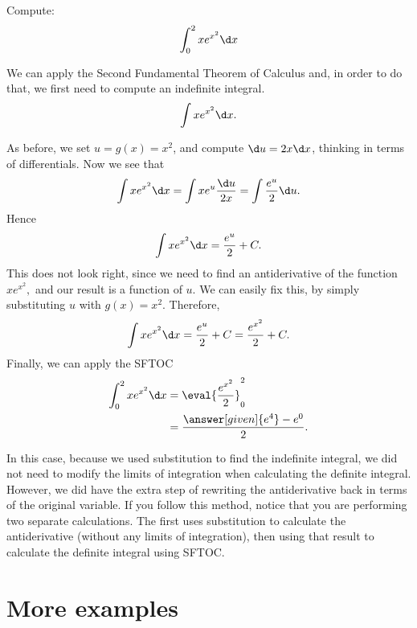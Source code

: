 \documentclass{ximera}
\begin{document}
\begin{example}
	Compute:
	\[ \int_0^2 x e^{x^2}\d x \]
	\begin{explanation}
		We can apply the Second Fundamental Theorem of Calculus and, in order to do that, we first need to compute an indefinite integral.
		\[ \int  x e^{x^2} \d x. \]
		
		As before, we set $u=g(x)=x^2$, and compute $\d u =  2x \d x$,
		 thinking in terms of differentials. Now we see that
		\[ \int   x e^{x^2} \d x = \int x e^{u} \frac{\d u}{2x} = \int \frac{e^{u}}{2}\d u . \]
		Hence 
		\[ \int  x e^{x^2} \d x = \frac{e^{u}}{2}+C . \]
		This does not look right, since  we need to find an antiderivative of the function $ x e^{x^2},$ and our result is a function of $u$.
		We can easily fix this, by simply substituting $u$ with $g(x)=x^2$.
		Therefore,
		\[ \int xe^{x^2}\d x =\frac{e^{u}}{2}+C= \frac{e^{x^2}}{2}+C . \]
		Finally, we can apply the SFTOC
		\begin{align*}
			\int_0^2 x e^{x^2}\d x &=\eval{\frac{e^{x^2}}{2}}_0^2\\
				&= \frac{\answer[given]{e^4} -e^0}{2}.
		\end{align*}
	\end{explanation}
\end{example}
In this case, because we used substitution to find the indefinite integral, we did not need to modify the limits of integration when 
calculating the definite integral. However, we did have the extra step of rewriting the antiderivative back in terms of the original variable.
If you follow this method, notice that you are performing two separate calculations. The first uses substitution to calculate the antiderivative (without any limits of integration), then using that result to calculate the definite integral using SFTOC.

\section{More examples}
\end{document}
